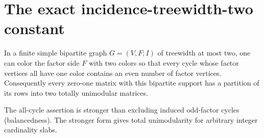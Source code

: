 \section{The exact incidence-treewidth-two constant}\label{sec:width-two}
\begin{theorem}\label{thm:one-sided-coloring}
In a finite simple bipartite graph $G=(V,F;I)$ of treewidth at most two,
one can color the factor side $F$ with two colors so that every cycle
whose factor vertices all have one color contains an even number of
factor vertices. Consequently every zero-one matrix with this bipartite
support has a partition of its rows into two totally unimodular matrices.
\end{theorem}
The all-cycle assertion is stronger than excluding induced odd-factor
cycles (balancedness). The stronger form gives total unimodularity for
arbitrary integer cardinality slabs.

